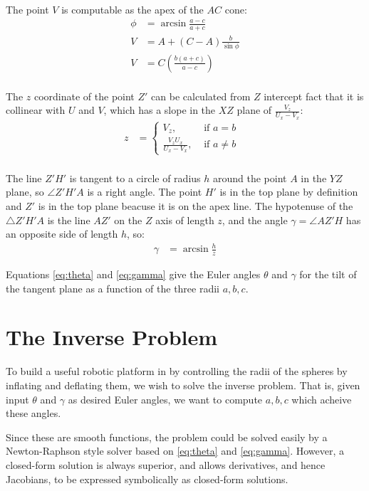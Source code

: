 \documentclass{article}
\begin{document}
The point $V$ is computable as the apex of the $AC$ cone:
\begin{align}
  \phi &= \arcsin{\frac{a - c}{a + c}} \\
  V &= A + (C-A) \frac{b}{\sin{\phi}} \\
  V &= C (\frac{b(a+c)}{a-c}) \\
\end{align}

The $z$ coordinate of the point $Z'$ can be calculated from
$Z$ intercept
fact that it is collinear with $U$ and $V$, which has a slope
in the $XZ$ plane of $\frac{V_z}{U_x-V_x}$:
\begin{align}
  z&= \begin{cases}
    V_z, & \text{ if $a = b$ } \\
    \frac{V_z U_x}{U_x - V_x}, & \text{ if  $a \neq b$}
  \end{cases}
  \label{eq:zprime} \\
\end{align}


The line $Z'H'$ is tangent to a circle of radius $h$ around the point $A$
in the $YZ$ plane, so $\angle Z'H'A$ is a right angle.
The point $H'$ is in the top plane by definition and $Z'$ is in the top plane
beacuse it is on the apex line.
The hypotenuse of the $\triangle Z'H'A$ is the line $AZ'$ on the $Z$ axis of
length $z$, and the angle $\gamma = \angle AZ'H$ has an opposite side of length $h$,
so:
\begin{align}
  \gamma &= \arcsin{\frac{h}{z}} \label{eq:gamma}
\end{align}

Equations \ref{eq:theta} and \ref{eq:gamma} give the Euler angles
$\theta$ and $\gamma$
for the tilt of the
tangent plane as a function of the three radii $a,b,c$.


\section{The Inverse Problem}

To build a useful robotic platform in by controlling the radii of the
spheres by inflating and deflating them, we wish to solve the inverse
problem. That is, given input $\theta$ and $\gamma$ as desired Euler
angles, we want to compute $a,b,c$ which acheive these angles.

Since these are smooth functions, the problem could be solved
easily by a Newton-Raphson style solver based on \ref{eq:theta} and \ref{eq:gamma}.
However, a closed-form solution is always superior, and allows derivatives,
and hence Jacobians, to be expressed symbolically as closed-form solutions.
\end{document}

